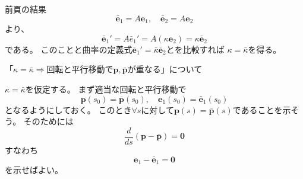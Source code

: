 \documentclass[a4j,disablejfam,dvipdfmx,papersize,slide,uplatex,21pt]{jsarticle}
\makeatletter
\renewenvironment{proof}[1][\proofname]{\par
        \pushQED{\qed}
        \normalfont
        \topsep6\p@\@plus6\p@ \trivlist
        \item[\hskip\labelsep{\bfseries #1}\@addpunct{\bfseries}]\ignorespaces
    }{%
        \popQED\endtrivlist\@endpefalse
    }
\renewcommand{\proofname}{証明.}
\makeatother
\begin{document}
\begin{proof}
    \newpage
    前頁の結果
    \begin{equation}
        \bar{\bm{e}}_1 = A \bm{e}_1, \quad
        \bar{\bm{e}}_2 = A \bm{e}_2
    \end{equation}
    より、
    \begin{equation}
        \bar{\bm{e}}_1' = A \bar{e}_1' = A (\kappa \bm{e}_2) = \kappa \bar{\bm{e}}_2
    \end{equation}
    である。
    このことと曲率の定義式$\bar{\bm{e}}_1' = \bar{\kappa} \bar{\bm{e}}_2$とを比較すれば
    $\kappa = \bar{\kappa}$を得る。

    \newpage
    「$\kappa = \bar{\kappa} \Rightarrow \text{回転と平行移動で$\bm{p}, \bar{\bm{p}}$が重なる}$」について

    $\kappa = \bar{\kappa}$を仮定する。
    まず適当な回転と平行移動で
    \begin{equation}
        \bm{p}(s_0) = \bar{\bm{p}}(s_0), \quad
        \bm{e}_1(s_0) = \bar{\bm{e}}_1(s_0)
    \end{equation}
    となるようにしておく。
    このとき$\forall s$に対して$\bm{p}(s) = \bar{\bm{p}}(s)$であることを示そう。
    そのためには
    \begin{equation}
        \frac{d}{ds} (\bm{p} - \bar{\bm{p}}) = \bm{0}
    \end{equation}
    すなわち
    \begin{equation}
        \bm{e}_1 - \bar{\bm{e}}_1 = \bm{0}
    \end{equation}
    を示せばよい。


\end{proof}
\end{document}
